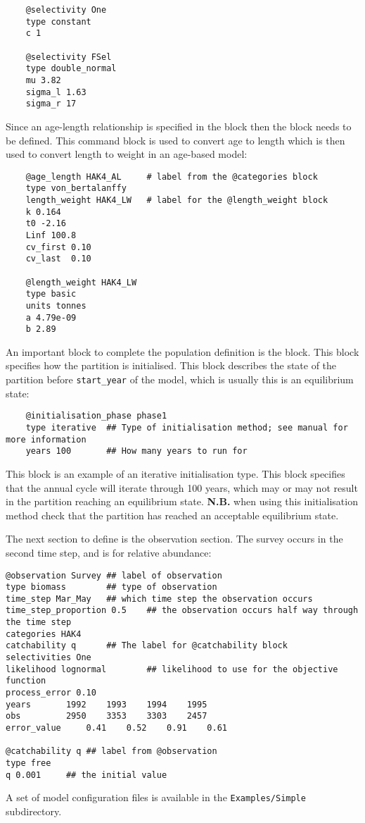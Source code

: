 {\small{\begin{verbatim}
	@selectivity One
	type constant 
	c 1
	
	@selectivity FSel
	type double_normal 
	mu 3.82
	sigma_l 1.63
	sigma_r 17
\end{verbatim}}}

Since an age-length relationship is specified in the  block then the  block needs to be defined.  This command block is used to convert age to length which is then used to convert length to weight in an age-based model:

{\small{\begin{verbatim}
	@age_length HAK4_AL		# label from the @categories block
	type von_bertalanffy
	length_weight HAK4_LW	# label for the @length_weight block
	k 0.164
	t0 -2.16
	Linf 100.8
	cv_first 0.10
	cv_last  0.10
	
	@length_weight HAK4_LW
	type basic
	units tonnes
	a 4.79e-09 
	b 2.89 
\end{verbatim}}}

An important block to complete the population definition is the  block. This block specifies how the partition is initialised. This block describes the state of the partition before \texttt{start\_year} of the model, which is usually this is an equilibrium state:

{\small{\begin{verbatim}
	@initialisation_phase phase1
	type iterative	## Type of initialisation method; see manual for more information
	years 100		## How many years to run for
\end{verbatim}}}

This block is an example of an iterative initialisation type. This block specifies that the annual cycle will iterate through 100 years, which may or may not result in the partition reaching an equilibrium state. \textbf{N.B.} when using this initialisation method check that the partition has reached an acceptable equilibrium state.

The next section to define is the observation section. The survey occurs in the second time step, and is for relative abundance:

{\small{\begin{verbatim}
@observation Survey	## label of observation
type biomass 		## type of observation
time_step Mar_May	## which time step the observation occurs
time_step_proportion 0.5	## the observation occurs half way through the time step
categories HAK4
catchability q		## The label for @catchability block
selectivities One
likelihood lognormal		## likelihood to use for the objective function
process_error 0.10
years 		1992 	1993 	1994 	1995 	
obs 		2950	3353	3303	2457
error_value 	0.41	0.52	0.91	0.61

@catchability q	## label from @observation
type free
q 0.001		## the initial value
		\end{verbatim}}}

A set of model configuration files is available in the \texttt{Examples/Simple} subdirectory.

